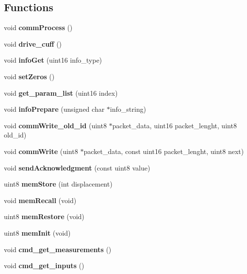 \subsection*{Functions}
\begin{DoxyCompactItemize}
\item 
\mbox{\label{command__processing_8c_a2e5d1711e19837adc3e8f479af3ae509}} 
void {\bfseries comm\+Process} ()
\item 
\mbox{\label{command__processing_8c_a8d9f34c84c2a23fa548a5266aa8227a6}} 
void {\bfseries drive\+\_\+cuff} ()
\item 
\mbox{\label{command__processing_8c_a525ccbc7ac3901d938dc352172ee2531}} 
void {\bfseries info\+Get} (uint16 info\+\_\+type)
\item 
\mbox{\label{command__processing_8c_ac8969cb5fdb4916f259075029741e727}} 
void {\bfseries set\+Zeros} ()
\item 
\mbox{\label{command__processing_8c_a5ef086c932682ca5f7549b74ead732aa}} 
void {\bfseries get\+\_\+param\+\_\+list} (uint16 index)
\item 
\mbox{\label{command__processing_8c_abacf855ed80e3052a5bb5b243a0d809e}} 
void {\bfseries info\+Prepare} (unsigned char $\ast$info\+\_\+string)
\item 
\mbox{\label{command__processing_8c_a517f4c61166381d40767fce9011e3c96}} 
void {\bfseries comm\+Write\+\_\+old\+\_\+id} (uint8 $\ast$packet\+\_\+data, uint16 packet\+\_\+lenght, uint8 old\+\_\+id)
\item 
\mbox{\label{command__processing_8c_a1a4919b18b8f9ea21abebd5836a8f35a}} 
void {\bfseries comm\+Write} (uint8 $\ast$packet\+\_\+data, const uint16 packet\+\_\+lenght, uint8 next)
\item 
\mbox{\label{command__processing_8c_af4a42b25376d2efd09096cbbed2fbce4}} 
void {\bfseries send\+Acknowledgment} (const uint8 value)
\item 
uint8 \textbf{ mem\+Store} (int displacement)
\item 
void \textbf{ mem\+Recall} (void)
\item 
uint8 \textbf{ mem\+Restore} (void)
\item 
uint8 \textbf{ mem\+Init} (void)
\item 
void \textbf{ cmd\+\_\+get\+\_\+measurements} ()
\item 
\mbox{\label{command__processing_8c_a20db4694e8caa572ec479f73ce8b3b02}} 
void {\bfseries cmd\+\_\+get\+\_\+inputs} ()
\item 
\mbox{\label{command__processing_8c_aaf613e251c1e14fe4fffe3e9e033f9f7}} 

\end{DoxyCompactItemize}
